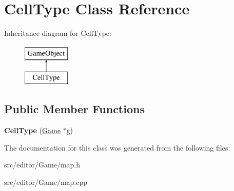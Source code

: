 \hypertarget{class_cell_type}{\section{\-Cell\-Type \-Class \-Reference}
\label{class_cell_type}
}
\-Inheritance diagram for \-Cell\-Type\-:\begin{figure}[H]
\begin{center}
\leavevmode
\includegraphics[height=2.000000cm]{class_cell_type}
\end{center}
\end{figure}
\subsection*{\-Public \-Member \-Functions}
\begin{DoxyCompactItemize}
\item 
\hypertarget{class_cell_type_aa616fd15f190534988db042679dbed8f}{{\bfseries \-Cell\-Type} (\hyperlink{class_game}{\-Game} $\ast$g)}\label{class_cell_type_aa616fd15f190534988db042679dbed8f}

\end{DoxyCompactItemize}


\-The documentation for this class was generated from the following files\-:\begin{DoxyCompactItemize}
\item 
src/editor/\-Game/map.\-h\item 
src/editor/\-Game/map.\-cpp\end{DoxyCompactItemize}
